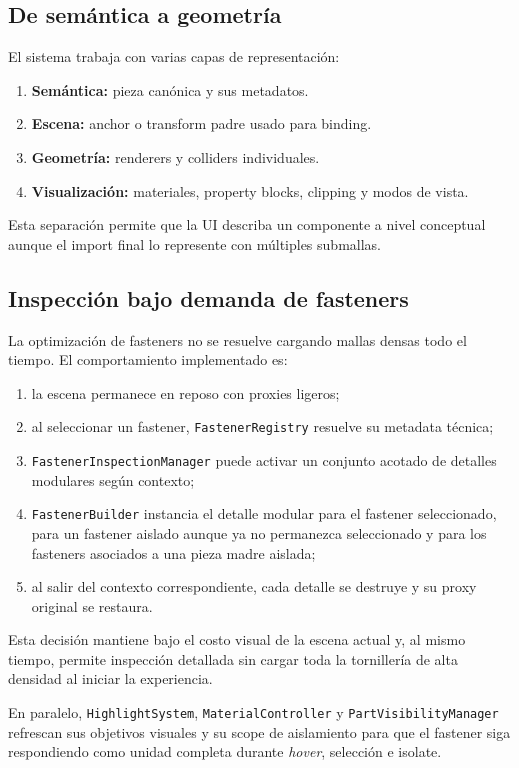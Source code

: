 \documentclass[12pt,letterpaper]{article}
\begin{document}
\subsection{De semántica a geometría}
El sistema trabaja con varias capas de representación:
\begin{enumerate}
    \item \textbf{Semántica:} pieza canónica y sus metadatos.
    \item \textbf{Escena:} anchor o transform padre usado para binding.
    \item \textbf{Geometría:} renderers y colliders individuales.
    \item \textbf{Visualización:} materiales, property blocks, clipping y modos de vista.
\end{enumerate}

\noindent Esta separación permite que la UI describa un componente a nivel conceptual aunque el import final lo represente con múltiples submallas.

\subsection{Inspección bajo demanda de fasteners}
La optimización de fasteners no se resuelve cargando mallas densas todo el tiempo. El comportamiento implementado es:
\begin{enumerate}
    \item la escena permanece en reposo con proxies ligeros;
    \item al seleccionar un fastener, \texttt{FastenerRegistry} resuelve su metadata técnica;
    \item \texttt{FastenerInspectionManager} puede activar un conjunto acotado de detalles modulares según contexto;
    \item \texttt{FastenerBuilder} instancia el detalle modular para el fastener seleccionado, para un fastener aislado aunque ya no permanezca seleccionado y para los fasteners asociados a una pieza madre aislada;
    \item al salir del contexto correspondiente, cada detalle se destruye y su proxy original se restaura.
\end{enumerate}

\noindent Esta decisión mantiene bajo el costo visual de la escena actual y, al mismo tiempo, permite inspección detallada sin cargar toda la tornillería de alta densidad al iniciar la experiencia.

\noindent En paralelo, \texttt{HighlightSystem}, \texttt{MaterialController} y \texttt{PartVisibilityManager} refrescan sus objetivos visuales y su scope de aislamiento para que el fastener siga respondiendo como unidad completa durante \textit{hover}, selección e isolate.
\end{document}

